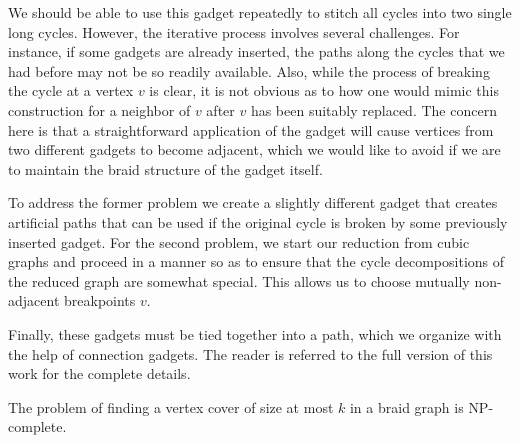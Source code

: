 \documentclass[svgnames]{llncs}
\newcommand{\NPC}{\textrm{\textup{NP-complete}}\xspace}
\begin{document}
{We should be able to use this gadget repeatedly to stitch all cycles into two single long cycles. However, the iterative process involves several challenges. For instance, if some gadgets are already inserted, 
the paths along the cycles that we had before may not be so readily available. Also, while the process of breaking the cycle at a vertex $v$ is clear, it is not obvious as to how one would mimic this 
construction for a neighbor of $v$ after $v$ has been suitably replaced. The concern here is that a straightforward application of the gadget will cause vertices from two different gadgets
to become adjacent, which we would like to avoid if we are to maintain the braid structure of the gadget itself. 

To address the former problem we create a slightly different gadget that creates artificial paths that can be used if the original cycle is broken by some previously inserted gadget. 
For the second problem, we start our reduction from cubic graphs and proceed in a manner so as to ensure that the cycle decompositions of the reduced graph are somewhat special. This allows us to choose mutually non-adjacent breakpoints $v$.

Finally, these gadgets must be tied together into a path, which we organize with the help of connection gadgets. The reader is referred to the full version of this work for the complete details. 

\begin{theorem}
The problem of finding a vertex cover of size at most $k$ in a braid graph is \NPC{}.
\end{theorem}


}
\end{document}
